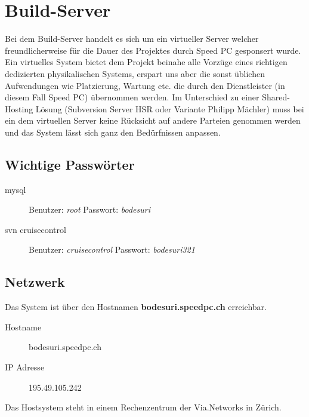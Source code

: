\documentclass[12pt,halfparskip]{scrreprt}
\begin{document}


\chapter{Build-Server} %
\label{cha:build_server}

Bei dem Build-Server handelt es sich um ein virtueller Server welcher freundlicherweise für die Dauer des Projektes durch Speed PC gesponsert wurde. Ein virtuelles System bietet dem Projekt beinahe alle Vorzüge eines richtigen dedizierten physikalischen Systems, erspart uns aber die sonst üblichen Aufwendungen wie Platzierung, Wartung etc. die durch den Dienstleister (in diesem Fall Speed PC) übernommen werden. Im Unterschied zu einer Shared-Hosting Lösung (Subversion Server HSR oder Variante Philipp Mächler) muss bei ein dem virtuellen Server keine Rücksicht auf andere Parteien genommen werden und das System lässt sich ganz den Bedürfnissen anpassen.


\section{Wichtige Passwörter} %
\label{sec:wichtige_passwörter}

\begin{description}
  \item[mysql] Benutzer: \emph{root} Passwort: \emph{bodesuri}
  \item[svn cruisecontrol] Benutzer: \emph{cruisecontrol} Passwort: \emph{bodesuri321}
\end{description}


\section{Netzwerk} %
\label{sec:netzwerk}

Das System ist über den Hostnamen \textbf{bodesuri.speedpc.ch} erreichbar. 

\begin{description}
  \item[Hostname] bodesuri.speedpc.ch
  \item[IP Adresse] 195.49.105.242
\end{description}

Das Hostsystem steht in einem Rechenzentrum der Via.Networks in Zürich.

\end{document}
